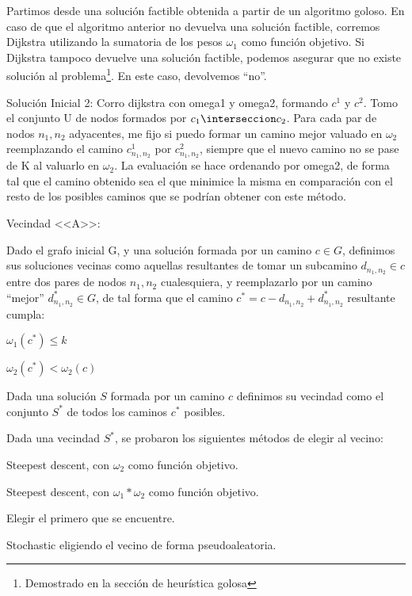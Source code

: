 


Partimos desde una solución factible obtenida a partir de un algoritmo goloso. En caso de que el algoritmo anterior no devuelva una solución factible, corremos Dijkstra utilizando la sumatoria de los pesos $\omega_1$ como función objetivo. Si Dijkstra tampoco devuelve una solución factible, podemos asegurar que no existe solución al problema\footnote{Demostrado en la sección de heurística golosa}. En este caso, devolvemos ``no''.

Solución Inicial 2:
Corro dijkstra con omega1 y omega2, formando $c^1$ y $c^2$. Tomo el conjunto U de nodos formados por $c_1 \interseccion c_2$. Para cada par de nodos $n_1,n_2$ adyacentes, me fijo si puedo formar un camino mejor valuado en $\omega_2$ reemplazando el camino $c^1_{n_1,n_2}$ por $c^2_{n_1,n_2}$, siempre que el nuevo camino no se pase de K al valuarlo en $\omega_2$. La evaluación se hace ordenando por omega2, de forma tal que el camino obtenido sea el que minimice la misma en comparación con el resto de los posibles caminos que se podrían obtener con este método.

Vecindad <<A>>: 

Dado el grafo inicial G, y una solución formada por un camino $c \in G$, definimos sus soluciones vecinas como aquellas resultantes de tomar un subcamino $d_{n_1,n_2} \in c$ entre dos pares de nodos $n_1,n_2$ cualesquiera, y reemplazarlo por un camino ``mejor'' $d_{n_1,n_2}^* \in G$, de tal forma que el camino $c^* = c - d_{n_1,n_2} + d_{n_1,n_2}^*$ resultante cumpla: 
\begin{list}
\item $\omega_1(c^*) \leq k $
\item $\omega_2(c^*) < \omega_2(c)$
\end{list}

Dada una solución $S$ formada por un camino $c$ definimos su vecindad como el conjunto $S^*$ de todos los caminos $c^*$ posibles.

Dada una vecindad $S^*$, se probaron los siguientes métodos de elegir al vecino:
\begin{list}
	\item Steepest descent, con $\omega_2$ como función objetivo.
	\item Steepest descent, con $\omega_1*\omega_2$ como función objetivo.
	\item Elegir el primero que se encuentre.
	\item Stochastic  eligiendo el vecino de forma pseudoaleatoria.
\end{list}

